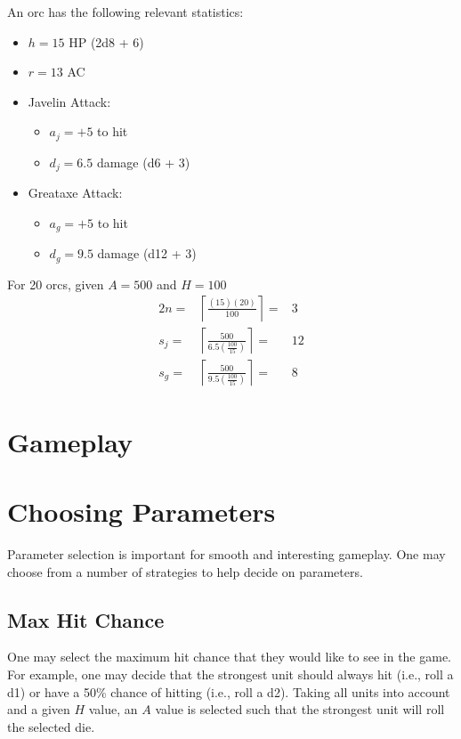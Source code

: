 \documentclass{article}
\begin{document}
An orc has the following relevant statistics:
\begin{itemize}
    \item $h = 15$ HP (2d8 + 6)
    \item $r = 13$ AC
    \item Javelin Attack:
        \begin{itemize}
            \item $a_j = +5$ to hit
            \item $d_j = 6.5$ damage (d6 + 3)
        \end{itemize}
    \item Greataxe Attack:
        \begin{itemize}
            \item $a_g = +5$ to hit
            \item $d_g = 9.5$ damage (d12 + 3)
        \end{itemize}
\end{itemize}

For 20 orcs, given $A = 500$ and $H = 100$
\begin{alignat*}{2}
    n   =&  \left\lceil\frac{(15)(20)}{100}\right\rceil             =&  3   \\
    s_j =&  \left\lceil\frac{500}{6.5(\frac{100}{15})}\right\rceil  =&  12  \\
    s_g =&  \left\lceil\frac{500}{9.5(\frac{100}{15})}\right\rceil  =&  8
\end{alignat*}


\section{Gameplay}\label{sec:game}

\section{Choosing Parameters}\label{sec:params}

Parameter selection is important for smooth and interesting gameplay.
One may choose from a number of strategies to help decide on parameters.

\subsection{Max Hit Chance}

One may select the maximum hit chance that they would like to see in the game.
For example, one may decide that the strongest unit should always hit (i.e., roll a d1)
or have a 50\% chance of hitting (i.e., roll a d2).
Taking all units into account and a given $H$ value,
an $A$ value is selected such that the strongest unit will roll the selected die.
\end{document}
